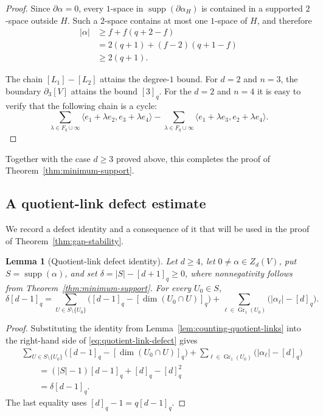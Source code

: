 \documentclass[11pt]{article}
\numberwithin{equation}{section}
\newtheorem{lemma}[theorem]{Lemma}
\newcommand{\Gr}{\operatorname{Gr}}
\newcommand{\supp}{\operatorname{supp}}
\begin{document}
\begin{proof}
Since $\partial\alpha=0$, every $1$-space in
$\supp(\partial\alpha_H)$ is contained in a supported $2$-space
outside $H$. Such a $2$-space contains at most one $1$-space of $H$,
and therefore
\begin{align*}
 |\alpha|
 &\ge f+f(q+2-f)\\
 &=2(q+1)+(f-2)(q+1-f)\\
 &\ge2(q+1).
\end{align*}

The chain $[L_1]-[L_2]$ attains the degree-$1$ bound. For $d=2$ and
$n=3$, the boundary $\partial_3[V]$ attains the bound $[3]_q$.
For the $d=2$ and $n=4$ it is easy to verify that the following chain is a cycle: \[\sum_{\lambda \in F_q \cup \infty} \langle e_1+\lambda e_2, e_3+\lambda e_4 \rangle  - \sum_{\lambda \in F_q \cup \infty} \langle e_1+\lambda e_3, e_2+\lambda e_4 \rangle.\]
\end{proof}

Together with the case $d\ge3$ proved above, this completes the proof
of Theorem~\ref{thm:minimum-support}.

\subsection{A quotient-link defect estimate}

We record a defect identity and a consequence of it that will be used in
the proof of Theorem~\ref{thm:gap-stability}.

\begin{lemma}[Quotient-link defect identity]
\label{lem:quotient-link-defect}
Let $d\ge4$, let $0\ne\alpha\in Z_d(V)$, put $S=\supp(\alpha)$, and
set $\delta=|S|-[d+1]_q\ge0$, where nonnegativity follows from
Theorem~\ref{thm:minimum-support}. For every $U_0\in S$,
\begin{equation}\label{eq:quotient-link-defect}
 \delta[d-1]_q
 =
 \sum_{U\in S\setminus\{U_0\}}
 \bigl([d-1]_q-[\dim(U_0\cap U)]_q\bigr)
 +
 \sum_{\ell\in\Gr_1(U_0)}\bigl(|\alpha_\ell|-[d]_q\bigr).
\end{equation}
\end{lemma}

\begin{proof}
Substituting the identity from
Lemma~\ref{lem:counting-quotient-links} into the right-hand side of
\eqref{eq:quotient-link-defect} gives
\begin{align*}
&\sum_{U\in S\setminus\{U_0\}}
 \bigl([d-1]_q-[\dim(U_0\cap U)]_q\bigr)
 +\sum_{\ell\in\Gr_1(U_0)}\bigl(|\alpha_\ell|-[d]_q\bigr)\\
&\qquad=(|S|-1)[d-1]_q+[d]_q-[d]_q^2\\
&\qquad=\delta[d-1]_q.
\end{align*}
The last equality uses $[d]_q-1=q[d-1]_q$.
\end{proof}
\end{document}
